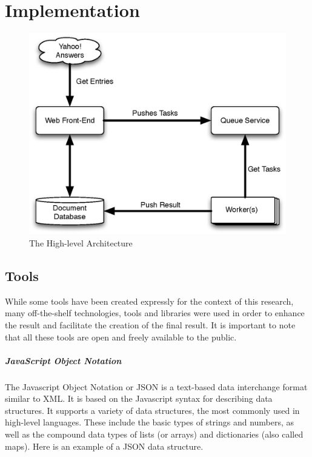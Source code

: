 \chapter{Implementation} %
\label{cha:implementation}

\begin{figure}[h]
  \begin{center}
    \includegraphics[width=\linewidth]{images/architecture}
  \end{center}
  \caption{The High-level Architecture}\label{fig:architecture}
\end{figure}

\section{Tools} %
\label{sec:tools}

While some tools have been created expressly for the context of this research, many off-the-shelf technologies, tools and libraries were used in order to enhance the result and facilitate the creation of the final result. It is important to note that all these tools are open and freely available to the public.

\paragraph{JavaScript Object Notation} %
\label{par:javascript_object_notation}

The Javascript Object Notation or JSON is a text-based data interchange format similar to XML. It is based on the Javascript syntax for describing data structures. It supports a variety of data structures, the most commonly used in high-level languages. These include the basic types of strings and numbers, as well as the compound data types of lists (or arrays) and dictionaries (also called maps). Here is an example of a JSON data structure.

